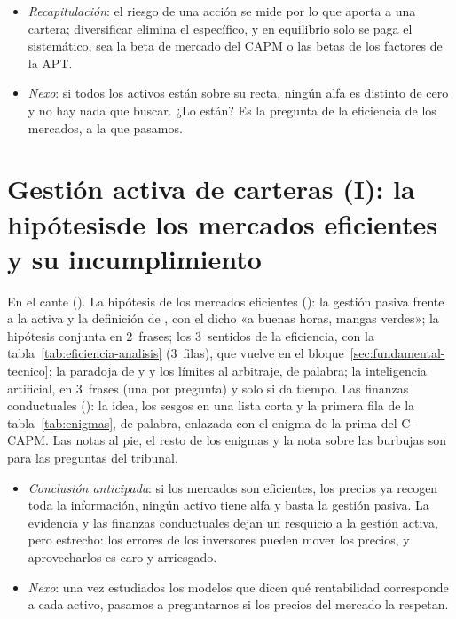 \documentclass[11pt]{article}
\begin{document}
\begin{itemize}
\item \emph{Recapitulación}: el riesgo de una acción se mide por lo que aporta a una cartera; diversificar elimina el específico, y en equilibrio solo se paga el sistemático, sea la beta de mercado del CAPM o las betas de los factores de la APT.
\item \emph{Nexo}: si todos los activos están sobre su recta, ningún alfa es distinto de cero y no hay nada que buscar. ¿Lo están? Es la pregunta de la eficiencia de los mercados, a la que pasamos.
\end{itemize}

\section{Gestión activa de carteras (I): la hipótesis\newline de los mercados eficientes y su incumplimiento}\label{sec:emh-bloque}

\begin{notaopositor}
En el cante (). La hipótesis de los mercados eficientes (): la gestión pasiva frente a la activa y la definición de , con el dicho «a buenas horas, mangas verdes»; la hipótesis conjunta en 2~frases; los 3~sentidos de la eficiencia, con la tabla~\ref{tab:eficiencia-analisis} (3~filas), que vuelve en el bloque~\ref{sec:fundamental-tecnico}; la paradoja de  y  y los límites al arbitraje, de palabra; la inteligencia artificial, en 3~frases (una por pregunta) y solo si da tiempo. Las finanzas conductuales (): la idea, los sesgos en una lista corta y la primera fila de la tabla~\ref{tab:enigmas}, de palabra, enlazada con el enigma de la prima del C-CAPM. Las notas al pie, el resto de los enigmas y la nota sobre las burbujas son para las preguntas del tribunal.
\end{notaopositor}

\begin{itemize}
\item \emph{Conclusión anticipada}: si los mercados son eficientes, los precios ya recogen toda la información, ningún activo tiene alfa y basta la gestión pasiva. La evidencia y las finanzas conductuales dejan un resquicio a la gestión activa, pero estrecho: los errores de los inversores pueden mover los precios, y aprovecharlos es caro y arriesgado.
\item \emph{Nexo}: una vez estudiados los modelos que dicen qué rentabilidad corresponde a cada activo, pasamos a preguntarnos si los precios del mercado la respetan.
\end{itemize}
\end{document}
